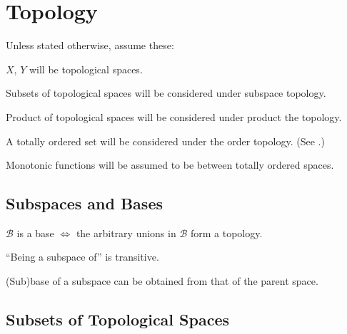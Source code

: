 \chapter{Topology}

\begin{conv}
	Unless stated otherwise, assume these:
	\begin{assmplist}
		\item $X$, $Y$ will be topological spaces.
		
		\item Subsets of topological spaces will be considered under subspace topology.
		
		\item Product of topological spaces will be considered under product the topology.
		
		\item A totally ordered set will be considered under the order topology. (See .)
		
		\item Monotonic functions will be assumed to be between totally ordered spaces.
	\end{assmplist}
\end{conv}



\section{Subspaces and Bases}

	\begin{lem}
		$\mathscr B$ is a base $\iff$ the arbitrary unions in $\mathscr B$ form a topology.
	\end{lem}
	
	\begin{lem}\label{LEM: subspaces and bases}
		\leavevmode
		\begin{mylist}
			\item ``Being a subspace of'' is transitive.
			
			\item\label{LEMii: subspaces and bases} (Sub)base of a subspace can be obtained from that of the parent space.
		\end{mylist}
	\end{lem}
	
	
	
	
\section{Subsets of Topological Spaces}

